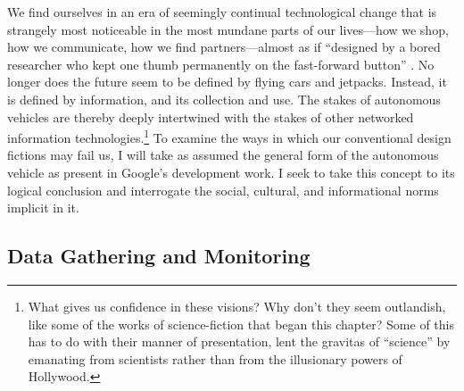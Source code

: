 We find ourselves in an era of seemingly continual technological
change that is strangely most noticeable in the most mundane parts of
our lives---how we shop, how we communicate, how we find
partners---almost as if ``designed by a bored researcher who kept one
thumb permanently on the fast-forward button'' \cite[p.
  7]{Neuromancer1984}. No longer does the future seem to be
defined by flying cars and jetpacks. Instead, it is defined by
information, and its collection and use. The stakes of autonomous
vehicles are thereby deeply intertwined with the
stakes of other networked information technologies.\footnote{What gives us confidence in
these visions? Why don't they seem 
outlandish, like some of the works of science-fiction that began this
chapter? Some of this has to do with their manner of 
presentation, lent the gravitas of ``science'' by emanating from
scientists rather than from the
illusionary powers of Hollywood.} To examine the
ways in which our conventional design fictions may fail us, I will
take as assumed the general form of the autonomous vehicle as present
in Google's development work. I seek to take this concept
to its logical conclusion and interrogate the social,
cultural, and informational norms implicit in it. 


\subsection{Data Gathering and Monitoring} 



